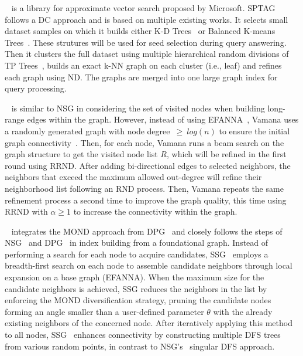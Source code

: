 ~\cite{SPTAG4} is a library for approximate vector search proposed by Microsoft. 
SPTAG follows a DC approach and is based on multiple existing works.  
It selects small dataset samples on which it builds either K-D Trees~\cite{kdtree} or Balanced K-means Trees~\cite{bkmtree}. These strutures will be used for seed selection during query answering. Then it clusters the full dataset using multiple hierarchical random divisions of TP Trees~\cite{tptree}, builds an exact k-NN graph on each cluster (i.e., leaf) and refines each graph using ND. The graphs are merged into one large graph index for query processing. 

~\cite{vamana} is similar to NSG in considering the set of visited nodes when building long-range edges within the graph. However, instead of using EFANNA~\cite{efanna}, Vamana uses a randomly generated graph with node degree~$\geq~log\left(n\right)$ to ensure the initial graph connectivity~\cite{erconnect}. 
Then, for each node, Vamana runs a beam search on the graph structure to get the visited node list $R$, which will be refined in the first round using RRND. After adding bi-directional edges to selected neighbors, the neighbors that exceed the maximum allowed out-degree will refine their neighborhood list following an RND process. Then, Vamana repeats the same refinement process a second time to improve the graph quality, this time using RRND with $\alpha \geq 1$ to increase the connectivity within the graph.

~\cite{nssg} integrates the MOND approach from DPG~\cite{dpg} and closely follows the steps of NSG~\cite{nsg} and DPG~\cite{dpg} in index building from a foundational graph. Instead of performing a search for each node to acquire candidates, SSG~\cite{nssg} employs a breadth-first search on each node to assemble candidate neighbors through local expansion on a base graph (EFANNA). When the maximum size for the candidate neighbors is achieved, SSG reduces the neighbors in the list by enforcing the MOND diversification strategy, pruning the candidate nodes forming an angle smaller than a user-defined parameter $\theta$ with the already existing neighbors of the concerned node. After iteratively applying this method to all nodes, SSG~\cite{nssg} enhances connectivity by constructing multiple DFS trees from various random points, in contrast to NSG's~\cite{nsg} singular DFS approach.

